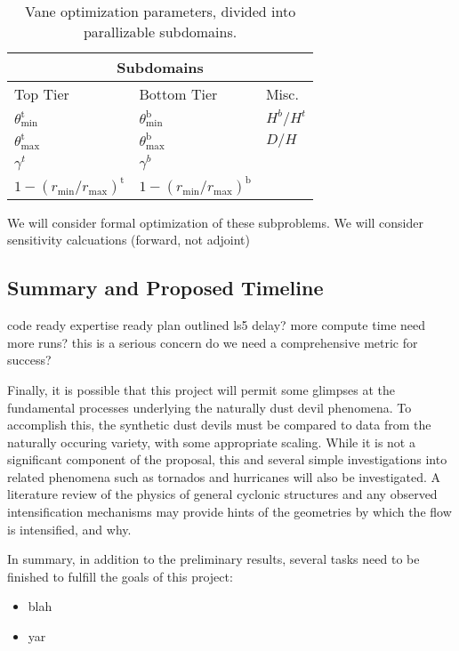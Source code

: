 \begin{center}
\begin{table}[h]
 \centering
  \begin{tabular}{|l | l | l |}
   \multicolumn{3}{c}{Subdomains} \\
    \hline
   Top Tier & Bottom Tier & Misc. \\
   \hline
   $\theta^{\text{t}}_{\text{min}}$ & $\theta^{\text{b}}_{\text{min}}$ &
       $H^b/H^t$ \\
   $\theta^{\text{t}}_{\text{max}}$ & $\theta^{\text{b}}_{\text{max}}$&
	   $D/H$ \\ 
   $\gamma^t$ & $\gamma^b$ & \\
   $1 - (r_{\text{min}} / r_{\text{max}})^{\text{t}}$ & $1 -
       (r_{\text{min}} / r_{\text{max}})^{\text{b}}$ & \\
   \hline
  \end{tabular}
  \caption{Vane optimization parameters, divided into parallizable
 subdomains.} 
  \label{tab:opt}
\end{table}
\end{center}

% 
% 

We will consider formal optimization of these subproblems. 
We will consider sensitivity calcuations (forward, not adjoint)

\subsection{Summary and Proposed Timeline}


%
%

code ready
expertise ready
plan outlined
ls5 delay?
more compute time
need more runs? this is a serious concern
do we need a comprehensive metric for success?

%
%
Finally, it is possible that this project will permit some glimpses 
at the fundamental processes underlying the naturally dust devil phenomena. To accomplish this, 
the synthetic dust devils must be compared to data from the naturally occuring variety, 
with some appropriate scaling. While it is not a significant component of the proposal, 
this and several simple investigations into related phenomena such as tornados and hurricanes will also 
be investigated. A literature review of the physics of general cyclonic structures and any  
observed intensification mechanisms may provide hints of the geometries by which the flow is 
intensified, and why. 

%
%
In summary, in addition to the preliminary results, several tasks need
to be finished to fulfill the goals of this project:

\begin{itemize}
\item blah
\item yar
\end{itemize}

%
%
